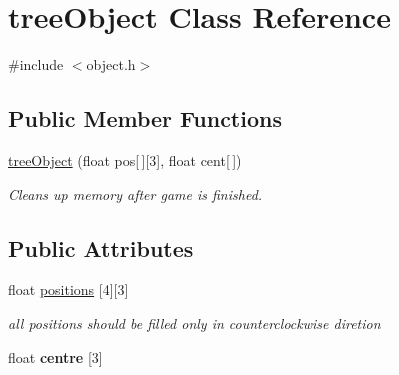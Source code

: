\hypertarget{classtreeObject}{\section{tree\-Object \-Class \-Reference}
\label{classtreeObject}
}


{\ttfamily \#include $<$object.\-h$>$}

\subsection*{\-Public \-Member \-Functions}
\begin{DoxyCompactItemize}
\item 
\hyperlink{classtreeObject_aa25a9d3a05556afa5ba9f4be6cbd9e92}{tree\-Object} (float pos\mbox{[}$\,$\mbox{]}\mbox{[}3\mbox{]}, float cent\mbox{[}$\,$\mbox{]})
\begin{DoxyCompactList}\small\item\em \-Cleans up memory after game is finished. \end{DoxyCompactList}\end{DoxyCompactItemize}
\subsection*{\-Public \-Attributes}
\begin{DoxyCompactItemize}
\item 
\hypertarget{classtreeObject_acf0d298de66635c8fb8ee34e084853b8}{float \hyperlink{classtreeObject_acf0d298de66635c8fb8ee34e084853b8}{positions} \mbox{[}4\mbox{]}\mbox{[}3\mbox{]}}\label{classtreeObject_acf0d298de66635c8fb8ee34e084853b8}

\begin{DoxyCompactList}\small\item\em all positions should be filled only in counterclockwise diretion \end{DoxyCompactList}\item 
\hypertarget{classtreeObject_ab9d82d44073d18602b196a22375203f5}{float {\bfseries centre} \mbox{[}3\mbox{]}}\label{classtreeObject_ab9d82d44073d18602b196a22375203f5}

\end{DoxyCompactItemize}
